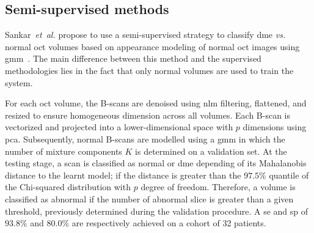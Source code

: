 \subsection{Semi-supervised methods}

Sankar~\textit{et~al.} propose to use a semi-supervised strategy to classify \gls{dme} \emph{vs.} normal \gls{oct} volumes based on appearance modeling of normal \gls{oct} images using \gls{gmm}~\cite{sankar2016classification}.
The main difference between this method and the supervised methodologies lies in the fact that only normal volumes are used to train the system.

For each \gls{oct} volume, the B-scans are denoised using \gls{nlm} filtering, flattened, and resized to ensure homogeneous dimension across all volumes.
Each B-scan is vectorized and projected into a lower-dimensional space with $p$ dimensions using \gls{pca}.
Subsequently, normal B-scans are modelled using a \gls{gmm} in which the number of mixture components $K$ is determined on a validation set.
At the testing stage, a scan is classified as normal or \gls{dme} depending of its Mahalanobis distance to the learnt model; if the distance is greater than the $97.5 \%$ quantile of the Chi-squared distribution with $p$ degree of freedom.
Therefore, a volume is classified as abnormal if the number of abnormal slice is greater than a given threshold, previously determined during the validation procedure.
A \gls{se} and \gls{sp} of $93.8 \%$ and $80.0 \%$ are respectively achieved on a cohort of 32 patients.
